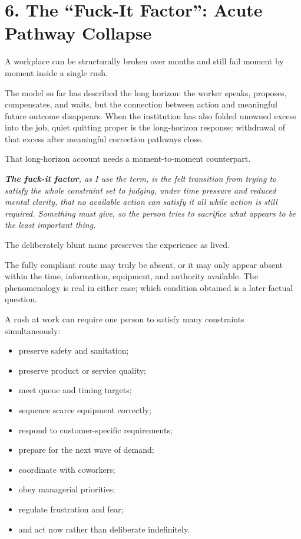 \documentclass[11pt,oneside]{article}
\providecommand{\tightlist}{%
  \setlength{\itemsep}{0.22em}\setlength{\parskip}{0pt}}
\renewenvironment{quote}
  {\begin{tcolorbox}[
      enhanced,
      breakable,
      colback=ManifestLight,
      colframe=ManifestRule,
      boxrule=0pt,
      leftrule=3pt,
      arc=0pt,
      outer arc=0pt,
      left=10pt,right=10pt,top=8pt,bottom=8pt,
      before skip=0.8em,after skip=0.8em
    ]\itshape}
  {\end{tcolorbox}}
\begin{document}
\hypertarget{the-fuck-it-factor-acute-pathway-collapse}{%
\section{6. The ``Fuck-It Factor'': Acute Pathway
Collapse}\label{the-fuck-it-factor-acute-pathway-collapse}}

A workplace can be structurally broken over months and still fail moment
by moment inside a single rush.

The model so far has described the long horizon: the worker speaks,
proposes, compensates, and waits, but the connection between action and
meaningful future outcome disappears. When the institution has also
folded unowned excess into the job, quiet quitting proper is the
long-horizon response: withdrawal of that excess after meaningful
correction pathways close.

That long-horizon account needs a moment-to-moment counterpart.

\begin{quote}
\textbf{The fuck-it factor}, as I use the term, is the felt transition
from trying to satisfy the whole constraint set to judging, under time
pressure and reduced mental clarity, that no available action can
satisfy it all while action is still required. Something must give, so
the person tries to sacrifice what appears to be the least important
thing.
\end{quote}

The deliberately blunt name preserves the experience as lived.

The fully compliant route may truly be absent, or it may only appear
absent within the time, information, equipment, and authority available.
The phenomenology is real in either case; which condition obtained is a
later factual question.

A rush at work can require one person to satisfy many constraints
simultaneously:

\begin{itemize}
\tightlist
\item
  preserve safety and sanitation;
\item
  preserve product or service quality;
\item
  meet queue and timing targets;
\item
  sequence scarce equipment correctly;
\item
  respond to customer-specific requirements;
\item
  prepare for the next wave of demand;
\item
  coordinate with coworkers;
\item
  obey managerial priorities;
\item
  regulate frustration and fear;
\item
  and act now rather than deliberate indefinitely.
\end{itemize}
\end{document}
